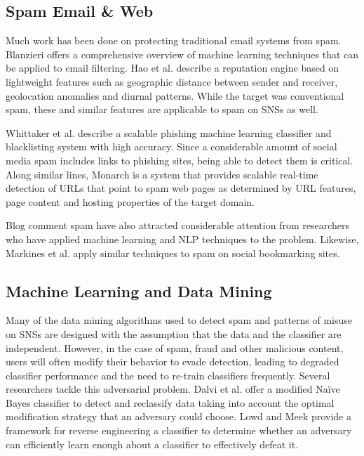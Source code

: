 \documentclass[preprint]{acm_proc_article-sp}
\begin{document}
\subsection{Spam Email \& Web}

Much work has been done on protecting traditional email systems from spam. 
Blanzieri \cite{blanzieri} offers a comprehensive overview of machine learning techniques 
that can be applied to email filtering. Hao et al. \cite{hao} describe a reputation 
engine based on lightweight features such as geographic distance between sender and 
receiver, geolocation anomalies and diurnal patterns. While the target was conventional 
spam, these and similar features are applicable to spam on SNSs as well.

Whittaker et al. \cite{whittaker} describe a scalable phishing machine learning 
classifier and blacklisting system with high accuracy. Since a considerable 
amount of social media spam includes links to phishing sites, being able to 
detect them is critical. Along similar lines, Monarch \cite{thomas} is a 
system that provides scalable real-time detection of URLs that point to spam web pages as 
determined by URL features, page content and hosting properties of the target domain.

Blog comment spam have also attracted considerable attention from researchers who 
have applied machine learning \cite{kolari, nag} and NLP \cite{mishne} techniques to the 
problem. Likewise, Markines et al. \cite{markines} apply similar techniques to spam on social bookmarking sites.

\subsection{Machine Learning and Data Mining}

Many of the data mining algorithms used to detect spam and patterns of misuse 
on SNSs are designed with the assumption that the data and the classifier are 
independent. However, in the case of spam, fraud and other malicious content, 
users will often modify their behavior to evade detection, leading to degraded 
classifier performance and the need to re-train classifiers frequently. Several 
researchers tackle this adversarial problem. Dalvi et al. \cite{dalvi} offer a 
modified Na\"ive Bayes classifier to detect and reclassify data taking into account 
the optimal modification strategy that an adversary could choose. Lowd and Meek \cite{lowd} 
provide a framework for reverse engineering a classifier to determine whether 
an adversary can efficiently learn enough about a classifier to effectively defeat it.
\end{document}
